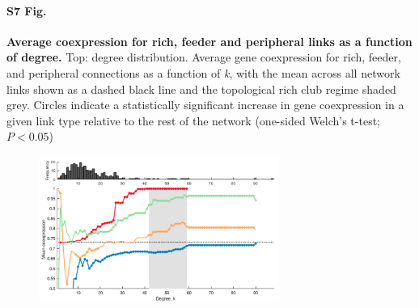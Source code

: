 \documentclass[10pt,letterpaper]{article}
\begin{document}
\paragraph*{S7 Fig.}
{\bf Average coexpression for rich, feeder and peripheral links as a function of degree.}
Top: degree distribution. Average gene coexpression for rich, feeder, and peripheral connections as a function of \textit{k}, with the mean across all network links shown as a dashed black line and the topological rich club regime shaded grey.
Circles indicate a statistically significant increase in gene coexpression in a given link type relative to the rest of the network (one-sided Welch’s t-test; $P < 0.05$)
\begin{figure}[!h]
\label{S8_Fig}
\centering
    \includegraphics[width=0.7\textwidth]{CoX0Mean}
\end{figure}



\end{document}
